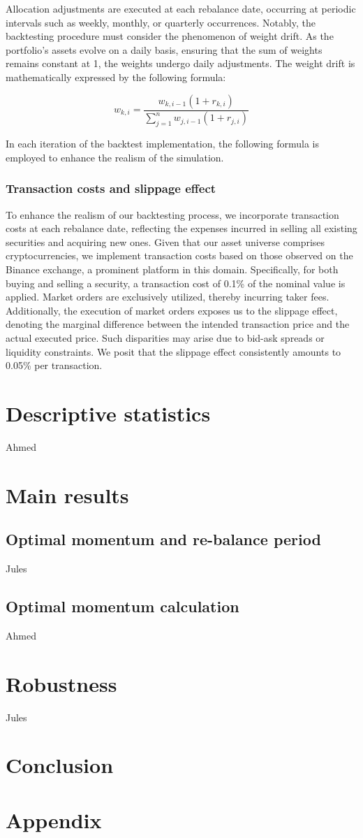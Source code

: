 \documentclass{article}
\begin{document}
Allocation adjustments are executed at each rebalance date, occurring at periodic intervals such as weekly, monthly, or quarterly occurrences. Notably, the backtesting procedure must consider the phenomenon of weight drift. As the portfolio's assets evolve on a daily basis, ensuring that the sum of weights remains constant at 1, the weights undergo daily adjustments. The weight drift is mathematically expressed by the following formula:

$$w_{k,i}=\frac{w_{k,i-1} (1+r_{k,i})}{\sum_{j=1}^n w_{j,i-1}(1+r_{j,i})}$$

In each iteration of the backtest implementation, the following formula is employed to enhance the realism of the simulation.
\subsubsection{Transaction costs and slippage effect}
To enhance the realism of our backtesting process, we incorporate transaction costs at each rebalance date, reflecting the expenses incurred in selling all existing securities and acquiring new ones. Given that our asset universe comprises cryptocurrencies, we implement transaction costs based on those observed on the Binance exchange, a prominent platform in this domain. Specifically, for both buying and selling a security, a transaction cost of 0.1\% of the nominal value is applied. Market orders are exclusively utilized, thereby incurring taker fees.\newline\newline
Additionally, the execution of market orders exposes us to the slippage effect, denoting the marginal difference between the intended transaction price and the actual executed price. Such disparities may arise due to bid-ask spreads or liquidity constraints. We posit that the slippage effect consistently amounts to 0.05\% per transaction.

\section{Descriptive statistics}\label{sec:descstats}
Ahmed
\section{Main results}\label{sec:mainres}
\subsection{Optimal momentum and re-balance period}
Jules
\subsection{Optimal momentum calculation}
Ahmed
\section{Robustness}\label{sec:robustness}
Jules
\section{Conclusion}
\section{Appendix}


\end{document}
